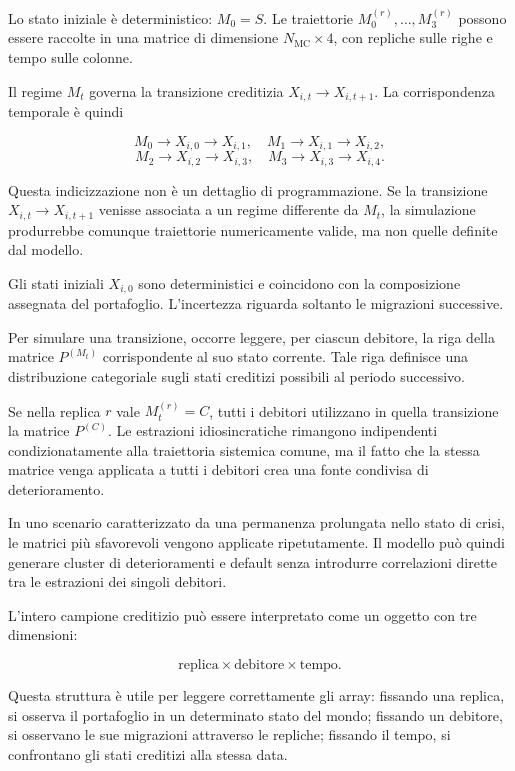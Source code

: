 Lo stato iniziale \`e deterministico: $M_0=S$. Le traiettorie
$M_0^{(r)},\ldots,M_3^{(r)}$ possono essere raccolte in una matrice di
dimensione $N_{\mathrm{MC}}\times4$, con repliche sulle righe e tempo sulle
colonne.

Il regime $M_t$ governa la transizione creditizia
$X_{i,t}\to X_{i,t+1}$. La corrispondenza temporale \`e quindi

\[
M_0\to X_{i,0}\to X_{i,1},
\quad
M_1\to X_{i,1}\to X_{i,2},
\]
\[
M_2\to X_{i,2}\to X_{i,3},
\quad
M_3\to X_{i,3}\to X_{i,4}.
\]

Questa indicizzazione non \`e un dettaglio di programmazione. Se la
transizione $X_{i,t}\to X_{i,t+1}$ venisse associata a un regime differente
da $M_t$, la simulazione produrrebbe comunque traiettorie numericamente
valide, ma non quelle definite dal modello.

Gli stati iniziali $X_{i,0}$ sono deterministici e coincidono con la
composizione assegnata del portafoglio. L'incertezza riguarda soltanto le
migrazioni successive.

Per simulare una transizione, occorre leggere, per ciascun debitore, la riga
della matrice $P^{(M_t)}$ corrispondente al suo stato corrente. Tale riga
definisce una distribuzione categoriale sugli stati creditizi possibili al
periodo successivo.

Se nella replica $r$ vale $M_t^{(r)}=C$, tutti i debitori utilizzano in
quella transizione la matrice $P^{(C)}$. Le estrazioni idiosincratiche
rimangono indipendenti condizionatamente alla traiettoria sistemica comune,
ma il fatto che la stessa matrice venga applicata a tutti i debitori crea una
fonte condivisa di deterioramento.

In uno scenario caratterizzato da una permanenza prolungata nello stato di
crisi, le matrici pi\`u sfavorevoli vengono applicate ripetutamente. Il
modello pu\`o quindi generare cluster di deterioramenti e default senza
introdurre correlazioni dirette tra le estrazioni dei singoli debitori.

L'intero campione creditizio pu\`o essere interpretato come un oggetto con
tre dimensioni:

\[
\text{replica}
\times
\text{debitore}
\times
\text{tempo}.
\]

Questa struttura \`e utile per leggere correttamente gli array: fissando una replica, si osserva il portafoglio in un determinato stato del mondo;
fissando un debitore, si osservano le sue migrazioni attraverso le repliche;
fissando il tempo, si confrontano gli stati creditizi alla stessa data.

